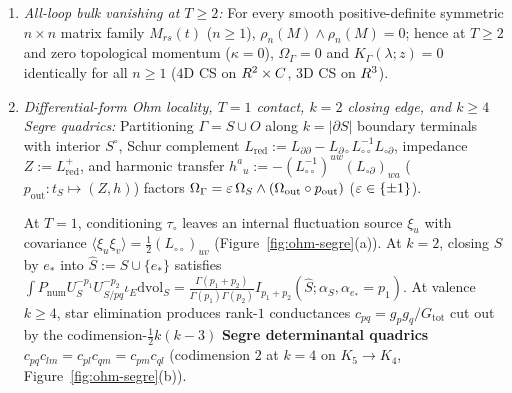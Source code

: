 \begin{theorem}[Algebraic Pfaffian vanishing $\rho_n(M)\wedge\rho_n(M) = 0$ for $T \ge 2$ and Ohm/Segre locality~{\cite{Repo9e833c8}}]
\label{thm:ohm-locality}
\leavevmode
\begin{enumerate}[label=(\arabic*),leftmargin=*]
  \item \emph{All-loop bulk vanishing at $T \ge 2$:} For every smooth positive-definite symmetric $n\times n$ matrix family $M_{rs}(t)$ ($n \ge 1$), $\rho_n(M)\wedge\rho_n(M) = 0$; hence at $T \ge 2$ and zero topological momentum ($\kappa = 0$), $\Omega_\Gamma = 0$ and $K_\Gamma(\lambda;z) = 0$ identically for all $n \ge 1$ ($4\mathrm{D}$ CS on $R^2\times C$, $3\mathrm{D}$ CS on $R^3$).

  \item \emph{Differential-form Ohm locality, $T=1$ contact, $k=2$ closing edge, and $k\ge 4$ Segre quadrics:} Partitioning $\Gamma = S \cup O$ along $k = |\partial S|$ boundary terminals with interior $S^\circ$, Schur complement $L_{\mathrm{red}} := L_{\partial\partial} - L_{\partial\circ}L_{\circ\circ}^{-1}L_{\circ\partial}$, impedance $Z := L_{\mathrm{red}}^+$, and harmonic transfer $h^a{}_u := -(L_{\circ\circ}^{-1})^{uw}(L_{\circ\partial})_{wa}$ ($p_{\mathrm{out}} : t_S \mapsto (Z,h)$) factors $\Omega_\Gamma = \varepsilon\,\Omega_S\wedge(\Omega_{\mathrm{out}}\circ p_{\mathrm{out}})$ ($\varepsilon \in \{\pm 1\}$).

  At $T = 1$, conditioning $\tau_\circ$ leaves an internal fluctuation source $\xi_u$ with covariance $\langle\xi_u\xi_v\rangle = \frac{1}{2}(L_{\circ\circ})_{uv}$ (Figure~\ref{fig:ohm-segre}(a)). At $k=2$, closing $S$ by $e_*$ into $\widehat{S} := S\cup\{e_*\}$ satisfies $\int P_{\mathrm{num}}U_S^{-p_1}U_{S/pq}^{-p_2}\iota_E\mathrm{dvol}_S = \frac{\Gamma(p_1+p_2)}{\Gamma(p_1)\Gamma(p_2)}I_{p_1+p_2}(\widehat{S}; \alpha_S, \alpha_{e_*}=p_1)$. At valence $k \ge 4$, star elimination produces rank-$1$ conductances $c_{pq} = g_p g_q / G_{\mathrm{tot}}$ cut out by the codimension-$\frac{1}{2}k(k-3)$ \textbf{Segre determinantal quadrics} $c_{pq}c_{lm} = c_{pl}c_{qm} = c_{pm}c_{ql}$ (codimension $2$ at $k=4$ on $K_5 \to K_4$, Figure~\ref{fig:ohm-segre}(b)).
\end{enumerate}
\end{theorem}

